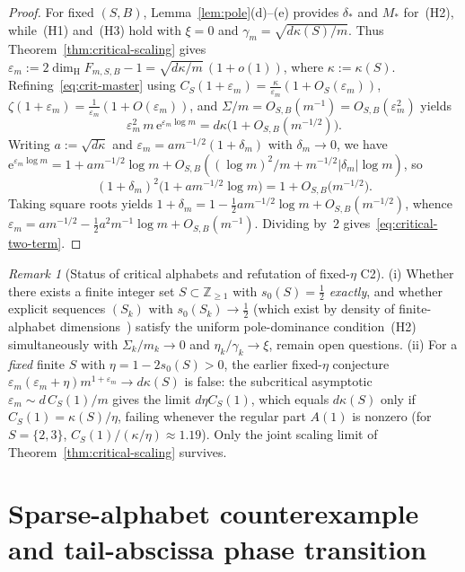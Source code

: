 \documentclass[11pt]{article}
\theoremstyle{definition}
\theoremstyle{remark}
\newtheorem{remark}[theorem]{Remark}
\newcommand{\Z}{\mathbb{Z}}
\newcommand{\ee}{\mathrm{e}}
\newcommand{\dimH}{\dim_{\mathrm{H}}}
\begin{document}
\begin{proof}
For fixed $(S,B)$, Lemma~\ref{lem:pole}(d)--(e) provides $\delta_*$ and $M_*$
for~(H2), while~(H1) and~(H3) hold with $\xi=0$ and
$\gamma_m=\sqrt{d\kappa(S)/m}$. Thus Theorem~\ref{thm:critical-scaling} gives
$\varepsilon_m:=2\dimH F_{m,S,B}-1=\sqrt{d\kappa/m}\,(1+o(1))$, where
$\kappa:=\kappa(S)$. Refining~\eqref{eq:crit-master} using
$C_S(1+\varepsilon_m)=\frac{\kappa}{\varepsilon_m}(1+O_S(\varepsilon_m))$,
$\zeta(1+\varepsilon_m)=\frac{1}{\varepsilon_m}(1+O(\varepsilon_m))$, and
$\Sigma/m=O_{S,B}(m^{-1})=O_{S,B}(\varepsilon_m^2)$ yields
\[
\varepsilon_m^2\,m\,\ee^{\varepsilon_m\log m}
=d\kappa\bigl(1+O_{S,B}(m^{-1/2})\bigr).
\]
Writing $a:=\sqrt{d\kappa}$ and $\varepsilon_m=a m^{-1/2}(1+\delta_m)$ with
$\delta_m\to0$, we have
$\ee^{\varepsilon_m\log m}=1+a m^{-1/2}\log m+O_{S,B}((\log m)^2/m+m^{-1/2}|\delta_m|\log m)$,
so
\[
(1+\delta_m)^2\bigl(1+a m^{-1/2}\log m\bigr)=1+O_{S,B}\bigl(m^{-1/2}\bigr).
\]
Taking square roots yields
$1+\delta_m=1-\frac12 a m^{-1/2}\log m+O_{S,B}(m^{-1/2})$, whence
$\varepsilon_m=a m^{-1/2}-\frac12 a^2 m^{-1}\log m+O_{S,B}(m^{-1})$. Dividing
by~$2$ gives~\eqref{eq:critical-two-term}.
\end{proof}

\begin{remark}[Status of critical alphabets and refutation of fixed-$\eta$ C2]\label{rem:naive-C2-false}
\textup{(i)} Whether there exists a finite integer set $S\subset\Z_{\ge1}$
with $s_0(S)=\frac12$ \emph{exactly}, and whether explicit sequences
$(S_k)$ with $s_0(S_k)\to\frac12$ (which exist by density of finite-alphabet
dimensions~\cite{MU99,CLU}) satisfy the uniform pole-dominance condition~(H2)
simultaneously with $\Sigma_k/m_k\to0$ and $\eta_k/\gamma_k\to\xi$, remain
open questions.
\textup{(ii)} For a \emph{fixed} finite $S$ with $\eta=1-2s_0(S)>0$, the
earlier fixed-$\eta$ conjecture
$\varepsilon_m(\varepsilon_m+\eta)m^{1+\varepsilon_m}\to d\kappa(S)$ is false:
the subcritical asymptotic $\varepsilon_m\sim d\,C_S(1)/m$ gives the limit
$d\eta C_S(1)$, which equals $d\kappa(S)$ only if $C_S(1)=\kappa(S)/\eta$,
failing whenever the regular part $A(1)$ is nonzero (for $S=\{2,3\}$,
$C_S(1)/(\kappa/\eta)\approx 1.19$). Only the joint scaling limit of
Theorem~\ref{thm:critical-scaling} survives.
\end{remark}

\section{Sparse-alphabet counterexample and tail-abscissa phase transition}\label{sec:sparse}
\end{document}

